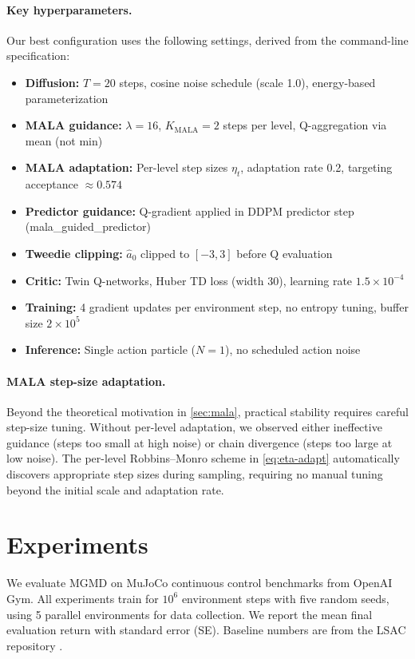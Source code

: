 \documentclass{article}
\theoremstyle{plain}
\theoremstyle{definition}
\theoremstyle{remark}
\begin{document}
\paragraph{Key hyperparameters.}
Our best configuration uses the following settings, derived from the command-line specification:
\begin{itemize}
  \item \textbf{Diffusion:} $T=20$ steps, cosine noise schedule (scale 1.0), energy-based parameterization
  \item \textbf{MALA guidance:} $\lambda=16$, $K_{\text{MALA}}=2$ steps per level, Q-aggregation via mean (not min)
  \item \textbf{MALA adaptation:} Per-level step sizes $\eta_t$, adaptation rate 0.2, targeting acceptance $\approx 0.574$
  \item \textbf{Predictor guidance:} Q-gradient applied in DDPM predictor step (mala\_guided\_predictor)
  \item \textbf{Tweedie clipping:} $\hat{a}_0$ clipped to $[-3, 3]$ before Q evaluation
  \item \textbf{Critic:} Twin Q-networks, Huber TD loss (width 30), learning rate $1.5 \times 10^{-4}$
  \item \textbf{Training:} 4 gradient updates per environment step, no entropy tuning, buffer size $2 \times 10^5$
  \item \textbf{Inference:} Single action particle ($N=1$), no scheduled action noise
\end{itemize}

\paragraph{MALA step-size adaptation.}
Beyond the theoretical motivation in \cref{sec:mala}, practical stability requires careful step-size tuning.
Without per-level adaptation, we observed either ineffective guidance (steps too small at high noise) or chain divergence (steps too large at low noise).
The per-level Robbins--Monro scheme in \cref{eq:eta-adapt} automatically discovers appropriate step sizes during sampling, requiring no manual tuning beyond the initial scale and adaptation rate.

\section{Experiments}
\label{sec:experiments}

We evaluate MGMD on MuJoCo continuous control benchmarks from OpenAI Gym.
All experiments train for $10^6$ environment steps with five random seeds, using 5 parallel environments for data collection.
We report the mean final evaluation return with standard error (SE).
Baseline numbers are from the LSAC repository \citep{lsac2025}.
\end{document}
